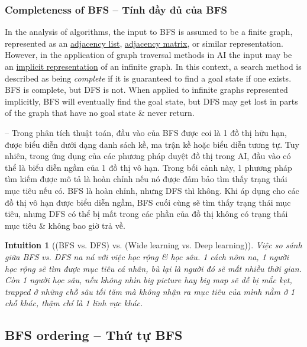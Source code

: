 \documentclass[oneside]{book}
\newtheorem{intuition}{Intuition}
\begin{document}

\subsubsection{Completeness of BFS -- Tính đầy đủ của BFS}
In the analysis of algorithms, the input to BFS is assumed to be a finite graph, represented as an \href{https://en.wikipedia.org/wiki/Adjacency_list}{adjacency list}, \href{https://en.wikipedia.org/wiki/Adjacency_matrix}{adjacency matrix}, or similar representation. However, in the application of graph traversal methods in AI the input may be an \href{https://en.wikipedia.org/wiki/Implicit_graph}{implicit representation} of an infinite graph. In this context, a search method is described as being {\it complete} if it is guaranteed to find a goal state if one exists. BFS is complete, but DFS is not. When applied to infinite graphs represented implicitly, BFS will eventually find the goal state, but DFS may get lost in parts of the graph that have no goal state \& never return.

-- Trong phân tích thuật toán, đầu vào của BFS được coi là 1 đồ thị hữu hạn, được biểu diễn dưới dạng danh sách kề, ma trận kề hoặc biểu diễn tương tự. Tuy nhiên, trong ứng dụng của các phương pháp duyệt đồ thị trong AI, đầu vào có thể là biểu diễn ngầm của 1 đồ thị vô hạn. Trong bối cảnh này, 1 phương pháp tìm kiếm được mô tả là hoàn chỉnh nếu nó được đảm bảo tìm thấy trạng thái mục tiêu nếu có. BFS là hoàn chỉnh, nhưng DFS thì không. Khi áp dụng cho các đồ thị vô hạn được biểu diễn ngầm, BFS cuối cùng sẽ tìm thấy trạng thái mục tiêu, nhưng DFS có thể bị mất trong các phần của đồ thị không có trạng thái mục tiêu \& không bao giờ trả về.


\begin{intuition}[(BFS vs. DFS) vs. (Wide learning vs. Deep learning)]
	Việc so sánh giữa BFS vs. DFS na ná với việc học rộng \& học sâu. 1 cách nôm na, 1 người học rộng sẽ tìm được mục tiêu cá nhân, bù lại là người đó sẽ mất nhiều thời gian. Còn 1 người học sâu, nếu không nhìn big picture hay big map sẽ dễ bị mắc kẹt, trapped ở những chỗ sâu tối tăm mà không nhận ra mục tiêu của mình nằm ở 1 chỗ khác, thậm chí là 1 lĩnh vực khác.
\end{intuition}


\subsection{BFS ordering -- Thứ tự BFS}
\end{document}
